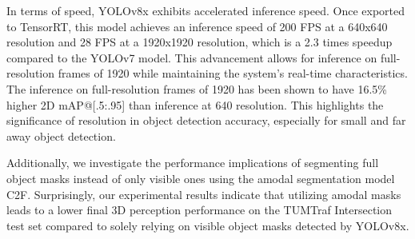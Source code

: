 In terms of speed, YOLOv8x exhibits accelerated inference speed. Once exported to TensorRT, this model achieves an inference speed of 200 FPS at a 640x640 resolution and 28 FPS at a 1920x1920 resolution, which is a 2.3 times speedup compared to the YOLOv7 model. This advancement allows for inference on full-resolution frames of 1920 while maintaining the system's real-time characteristics. The inference on full-resolution frames of 1920 has been shown to have 16.5\% higher 2D mAP@[.5:.95] than inference at 640 resolution. This highlights the significance of resolution in object detection accuracy, especially for small and far away object detection.

Additionally, we investigate the performance implications of segmenting full object masks instead of only visible ones using the amodal segmentation model C2F. Surprisingly, our experimental results indicate that utilizing amodal masks leads to a lower final 3D perception performance on the TUMTraf Intersection test set compared to solely relying on visible object masks detected by YOLOv8x. 


